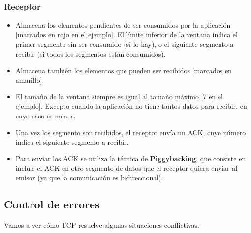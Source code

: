 \subsubsection{Receptor}
\begin{itemize}
    \item Almacena los elementos pendientes de ser consumidos por la aplicación [marcados en rojo en el ejemplo]. El límite inferior de la ventana indica el primer segmento sin ser consumido (si lo hay), o el siguiente segmento a recibir (si todos los segmentos están consumidos).
    \item Almacena también los elementos que pueden ser recibidos [marcados en amarillo].
    \item El tamaño de la ventana siempre es igual al tamaño máximo [7 en el ejemplo]. Excepto cuando la aplicación no tiene tantos datos para recibir, en cuyo caso es menor.
    \item Una vez los segmento son recibidos, el receptor envía un ACK, cuyo número indica el siguiente segmento a recibir.
    \item Para enviar los ACK se utiliza la técnica de \textbf{Piggybacking}, que consiste en incluir el ACK en otro segmento de datos que el receptor quiera enviar al emisor (ya que la comunicación es bidireccional).
\end{itemize}
\newpage
\subsection{Control de errores}
Vamos a ver cómo TCP resuelve algunas situaciones conflictivas.
